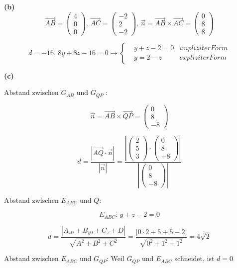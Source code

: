 \documentclass[fleqn]{article}
\begin{document}
\indent\indent\textbf{(b)}
$$\overrightarrow{AB}=\begin{pmatrix}
    4\\0\\0
\end{pmatrix},\,\overrightarrow{AC}=\begin{pmatrix}
    -2\\2\\-2
\end{pmatrix},\,\vec{n}=\overrightarrow{AB}\times \overrightarrow{AC}=\begin{pmatrix}
    0\\8\\8
\end{pmatrix}$$
        
$$ d=-16,\,8y+8z-16=0\rightarrow\left\{
\begin{aligned}
    &y+z-2=0 & impliziter Form\\
    &y=2-z & expliziter Form
\end{aligned}
\right.
$$

\indent\indent\textbf{(c)}

Abstand zwischen $G_{AB}$ und $G_{QP}$ :

$$\vec{n}=\overrightarrow{AB}\times\overrightarrow{QP}=\begin{pmatrix}
    0\\8\\-8
\end{pmatrix}$$

$$d=\frac{|\overrightarrow{AQ}\cdot\vec{n}|}{|\vec{n}|}=\frac{\left|\begin{pmatrix}2\\5\\3\end{pmatrix}\cdot\begin{pmatrix}0\\8\\-8\end{pmatrix}\right|}{\left|\begin{pmatrix}0\\8\\-8\end{pmatrix}\right|}$$

\indent\indent\indent Abstand zwischen $E_{ABC}$ und $Q$:

$$E_{ABC}:\,y+z-2=0$$

$$d=\frac{|A_{x0}+B_{y0}+C_z+D|}{\sqrt{A^2+B^2+C^2}}=\frac{|0\cdot 2+5+5-2|}{\sqrt{0^2+1^2+1^2}}=4\sqrt{2}$$

\indent\indent\indent Abstand zwischen $E_{ABC}$ und $G_{QP}$: Weil $G_{QP}$ und $E_{ABC}$ schneidet, ist $d=0$
\end{document}
